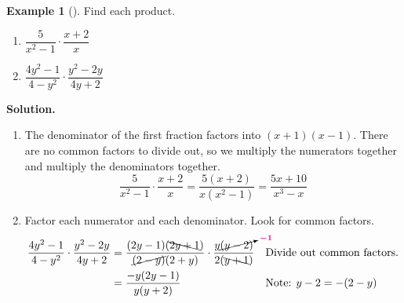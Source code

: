 \documentclass[10pt,]{book}
\theoremstyle{plain}
\theoremstyle{definition}
\theoremstyle{definition}
\newtheorem{example}[theorem]{Example}
\theoremstyle{definition}
\numberwithin{equation}{part}
\newcommand{\alert}[1]{\boldsymbol{\color{magenta}{#1}}}
\newcommand{\amp}{&}
\begin{document}
\begin{example}[]\label{example-59}
Find each product. \leavevmode%
\begin{enumerate}[label=*\alph**]
\item\hypertarget{li-291}{}\(\dfrac{5}{x^2-1}\cdot\dfrac{x+2}{x}\)%
\item\hypertarget{li-292}{}\(\dfrac{4y^2-1}{4-y^2}\cdot\dfrac{y^2-2y}{4y+2}\)%
\end{enumerate}
%
\par\medskip\noindent%
\textbf{Solution.}\quad \leavevmode%
\begin{enumerate}[label=*\alph**]
\item\hypertarget{li-293}{}The denominator of the first fraction factors into \((x + 1) (x − 1)\). There are no common factors to divide out, so we multiply the numerators together and multiply the denominators together.%
\begin{equation*}
\frac{5}{x^2-1}\cdot\frac{x+2}{x}=\frac{5(x+2)}{x(x^2-1)}=\frac{5x+10}{x^3-x} 
\end{equation*}
%
\item\hypertarget{li-294}{}Factor each numerator and each denominator. Look for common factors.%
\begin{align*}
\frac{4y^2-1}{4-y^2}\cdot\frac{y^2-2y}{4y+2} \amp = \frac{(2y-1)(\bcancel{2y+1})}{\cancel{(2-y)}(2+y)} \cdot \frac{y\cancelto{\alert{-1}}{(y-2)}}{2(\bcancel{y+1})}\amp\amp\text{Divide out common factors.}
\\
\amp =\frac{-y(2y-1)}{y(y+2)} \amp\amp\text{Note: }y-2=-(2-y)
\end{align*}
%
\end{enumerate}
%
\end{example}
\typeout{************************************************}
\typeout{************************************************}
\end{document}
